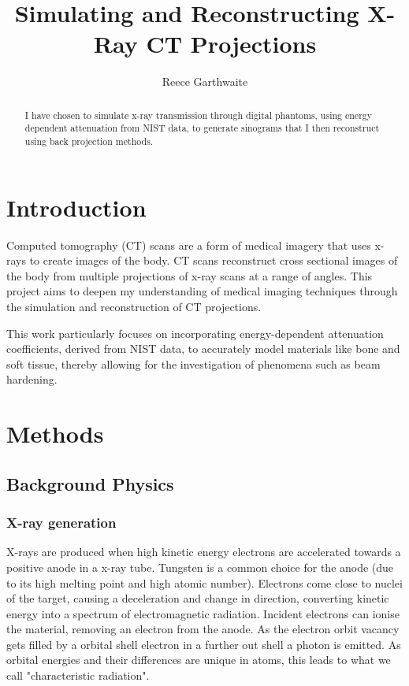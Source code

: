\documentclass{article}
\title{Simulating and Reconstructing X-Ray CT Projections}
\author{Reece Garthwaite}
\date{}
\theoremstyle{definition}
\begin{document}
\maketitle

\begin{abstract}
I have chosen to simulate x-ray transmission through digital phantoms, using energy dependent attenuation from NIST data, to generate sinograms that I then reconstruct using back projection methods.
\end{abstract}

\section{Introduction}
Computed tomography (CT) scans are a form of medical imagery that uses x-rays to  create images of the body. CT scans reconstruct cross sectional images of the body from multiple projections of x-ray scans at a range of angles. This project aims to deepen my understanding of medical imaging techniques through the simulation and reconstruction of CT projections. 

This work particularly focuses on incorporating energy-dependent attenuation coefficients, derived from NIST data, to accurately model materials like bone and soft tissue, thereby allowing for the investigation of phenomena such as beam hardening.

\section{Methods}

\subsection{Background Physics}
\subsubsection{X-ray generation}
X-rays are produced when high kinetic energy electrons are accelerated towards a positive anode in a x-ray tube. Tungsten is a common choice for the anode (due to its high melting point and high atomic number). Electrons come close to nuclei of the target, causing a deceleration and change in direction, converting kinetic energy into a spectrum of electromagnetic radiation. Incident electrons can ionise the material, removing an electron from the anode. As the electron orbit vacancy gets filled by a orbital shell electron in a further out shell a photon is emitted. As orbital energies and their differences are unique in atoms, this leads to what we call "characteristic radiation".
\cite{Tafti}
\end{document}
